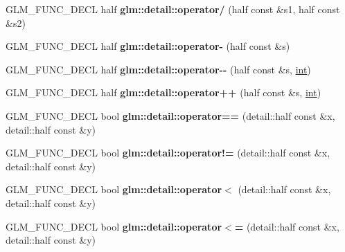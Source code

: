\begin{DoxyCompactItemize}
\item 
\hypertarget{namespaceglm_1_1detail_a1e1744732d76d7cdc5cbc0eb22a516f5}{}G\+L\+M\+\_\+\+F\+U\+N\+C\+\_\+\+D\+E\+C\+L half {\bfseries glm\+::detail\+::operator/} (half const \&s1, half const \&s2)\label{namespaceglm_1_1detail_a1e1744732d76d7cdc5cbc0eb22a516f5}

\item 
\hypertarget{namespaceglm_1_1detail_ad5b647da2740caf9952963ef8f83e25c}{}G\+L\+M\+\_\+\+F\+U\+N\+C\+\_\+\+D\+E\+C\+L half {\bfseries glm\+::detail\+::operator-\/} (half const \&s)\label{namespaceglm_1_1detail_ad5b647da2740caf9952963ef8f83e25c}

\item 
\hypertarget{namespaceglm_1_1detail_a47c575836608a210c271d8e9ae4ce100}{}G\+L\+M\+\_\+\+F\+U\+N\+C\+\_\+\+D\+E\+C\+L half {\bfseries glm\+::detail\+::operator-\/-\/} (half const \&s, \hyperlink{_s_d_l__thread_8h_a6a64f9be4433e4de6e2f2f548cf3c08e}{int})\label{namespaceglm_1_1detail_a47c575836608a210c271d8e9ae4ce100}

\item 
\hypertarget{namespaceglm_1_1detail_a4249333cb751ad58be862ace76b9ca75}{}G\+L\+M\+\_\+\+F\+U\+N\+C\+\_\+\+D\+E\+C\+L half {\bfseries glm\+::detail\+::operator++} (half const \&s, \hyperlink{_s_d_l__thread_8h_a6a64f9be4433e4de6e2f2f548cf3c08e}{int})\label{namespaceglm_1_1detail_a4249333cb751ad58be862ace76b9ca75}

\item 
\hypertarget{namespaceglm_1_1detail_a06e2e65ba3b1b8fbf4bd36fa162d1291}{}G\+L\+M\+\_\+\+F\+U\+N\+C\+\_\+\+D\+E\+C\+L bool {\bfseries glm\+::detail\+::operator==} (detail\+::half const \&x, detail\+::half const \&y)\label{namespaceglm_1_1detail_a06e2e65ba3b1b8fbf4bd36fa162d1291}

\item 
\hypertarget{namespaceglm_1_1detail_a3fe68870255106305088d5c273f70efa}{}G\+L\+M\+\_\+\+F\+U\+N\+C\+\_\+\+D\+E\+C\+L bool {\bfseries glm\+::detail\+::operator!=} (detail\+::half const \&x, detail\+::half const \&y)\label{namespaceglm_1_1detail_a3fe68870255106305088d5c273f70efa}

\item 
\hypertarget{namespaceglm_1_1detail_a9f821b272dc39cf31c8a8038f17921f4}{}G\+L\+M\+\_\+\+F\+U\+N\+C\+\_\+\+D\+E\+C\+L bool {\bfseries glm\+::detail\+::operator$<$} (detail\+::half const \&x, detail\+::half const \&y)\label{namespaceglm_1_1detail_a9f821b272dc39cf31c8a8038f17921f4}

\item 
\hypertarget{namespaceglm_1_1detail_a24edd3f0ef3858bc7ba1af612906ec9d}{}G\+L\+M\+\_\+\+F\+U\+N\+C\+\_\+\+D\+E\+C\+L bool {\bfseries glm\+::detail\+::operator$<$=} (detail\+::half const \&x, detail\+::half const \&y)\label{namespaceglm_1_1detail_a24edd3f0ef3858bc7ba1af612906ec9d}


\end{DoxyCompactItemize}
